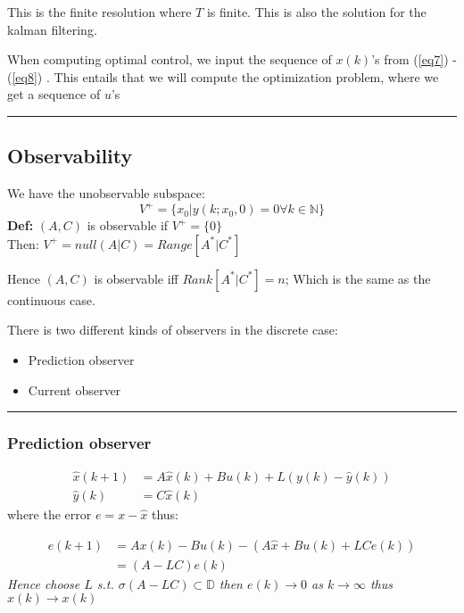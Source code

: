\documentclass[a4paper]{article}
\begin{document}
This is the finite resolution where $ T $ is finite. 
This is also the solution for the kalman filtering. 

When computing optimal control, we input the sequence of $ x(k) $'s from (\ref{eq7}) - (\ref{eq8})  . This entails that we will compute the optimization problem, where we get a sequence of $u$'s 

\vspace{5pt}
\hrule
\vspace{5pt}
\subsection{Observability}
We have the unobservable subspace:
\begin{equation}
	V^{+} = \{x_0 | y(k; x_0, 0) = 0 \forall k \in \mathbb{N}\}
\end{equation}
\textbf{Def:} $ (A,C) $ is observable if $ V^{+} = \{0\}$ \\
Then: $ V^{+} = null(A|C) = Range[A^{*}|C^{*}]$

Hence $ (A,C) $ is observable iff  $ Rank[A^{*}|C^{*}] = n$; Which is the same as the continuous case. 

There is two different kinds of observers in the discrete case:
\begin{itemize}
	\item Prediction observer
	\item Current observer
\end{itemize}

\vspace{5pt}
\hrule
\vspace{5pt}
\subsubsection{Prediction observer}
\begin{align}
	\hat{x}(k+1) &= A \hat{x}(k) + B u(k) + L(y(k)-\hat{y}(k))\\
	\hat{y}(k) &= C \hat{x}(k)
\end{align}
where the error $ e = x - \hat{x} $ thus:

\begin{align}
e(k+1) &= A x(k) - B u (k) - ( A \hat{x} + B u( k ) + L C e(k) ) \\ 
	   &= (A -L C)e(k)
\end{align}
\textit{Hence choose $ L $ s.t.  $ \sigma(A - LC ) \subset \mathbb{D}$ then $ e(k) \rightarrow 0 $ as $ k \rightarrow  \infty  $ thus $ \hat{x}(k) \rightarrow x(k) $} 
\end{document}
